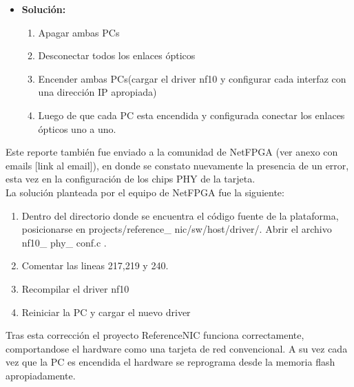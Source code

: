 \begin{itemize}
\item \textbf{Soluci\'on:}
\begin{enumerate}
\item Apagar ambas PCs
\item Desconectar todos los enlaces \'opticos
\item Encender ambas PCs(cargar el driver nf10 y configurar cada interfaz con una direcci\'on IP apropiada)
\item Luego de que cada PC esta encendida y configurada conectar los enlaces \'opticos uno a uno.
\end{enumerate}

\end{itemize}

Este reporte tambi\'en fue enviado a la comunidad de NetFPGA (ver anexo con emails [link al email]), en donde se constato nuevamente la presencia de un error, esta vez en la configuraci\'on de los chips PHY de la tarjeta.\\ 

La soluci\'on planteada por el equipo de NetFPGA fue la siguiente:

\begin{enumerate}
\item Dentro del directorio donde se encuentra el c\'odigo fuente de la plataforma, posicionarse en 
	  projects/reference\_ nic/sw/host/driver/. Abrir el archivo nf10\_ phy\_ conf.c .
\item Comentar las lineas 217,219 y 240.
\item Recompilar el driver nf10
\item Reiniciar la PC y cargar el nuevo driver
\end{enumerate}

Tras esta correcci\'on el proyecto ReferenceNIC funciona correctamente, comportandose el hardware como una tarjeta de red convencional. A su vez cada vez que la PC es encendida el hardware se reprograma desde la memoria flash apropiadamente.


